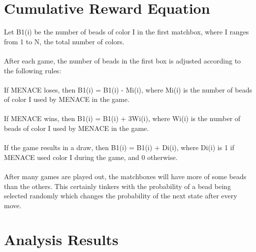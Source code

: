 \documentclass[letterpaper, 12 pt, conference]{IEEEtran}
\begin{document}
\section{ Cumulative Reward Equation}
Let B1(i) be the number of beads of color I in the first matchbox, where I ranges from 1 to N, the total number of colors.\\\\
After each game, the number of beads in the first box is adjusted according to the following rules:\\\\
If MENACE loses, then B1(i) = B1(i) - Mi(i), where Mi(i) is the number of beads of color I used by MENACE in the game.\\\\
If MENACE wins, then B1(i) = B1(i) + 3Wi(i), where Wi(i) is the number of beads of color I used by MENACE in the game.\\\\
If the game results in a draw, then B1(i) = B1(i) + Di(i), where Di(i) is 1 if MENACE used color I during the game, and 0 otherwise.\\\\
After many games are played out, the matchboxes will have
more of some beads than the others. This certainly tinkers
with the probability of a bead being selected randomly which
changes the probability of the next state after every move.\\

\section{Analysis  Results}
\end{document}
